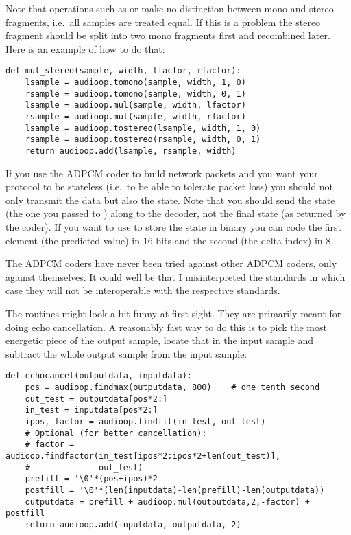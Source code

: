 Note that operations such as  or  make no
distinction between mono and stereo fragments, i.e.\ all samples are
treated equal.  If this is a problem the stereo fragment should be split
into two mono fragments first and recombined later.  Here is an example
of how to do that:
\bcode\begin{verbatim}
def mul_stereo(sample, width, lfactor, rfactor):
    lsample = audioop.tomono(sample, width, 1, 0)
    rsample = audioop.tomono(sample, width, 0, 1)
    lsample = audioop.mul(sample, width, lfactor)
    rsample = audioop.mul(sample, width, rfactor)
    lsample = audioop.tostereo(lsample, width, 1, 0)
    rsample = audioop.tostereo(rsample, width, 0, 1)
    return audioop.add(lsample, rsample, width)
\end{verbatim}\ecode

If you use the ADPCM coder to build network packets and you want your
protocol to be stateless (i.e.\ to be able to tolerate packet loss)
you should not only transmit the data but also the state. Note that
you should send the  state (the one you passed to
) along to the decoder, not the final state (as returned by
the coder). If you want to use  to store the state in
binary you can code the first element (the predicted value) in 16 bits
and the second (the delta index) in 8.

The ADPCM coders have never been tried against other ADPCM coders,
only against themselves. It could well be that I misinterpreted the
standards in which case they will not be interoperable with the
respective standards.

The  routines might look a bit funny at first sight.
They are primarily meant for doing echo cancellation. A reasonably
fast way to do this is to pick the most energetic piece of the output
sample, locate that in the input sample and subtract the whole output
sample from the input sample:
\bcode\begin{verbatim}
def echocancel(outputdata, inputdata):
    pos = audioop.findmax(outputdata, 800)    # one tenth second
    out_test = outputdata[pos*2:]
    in_test = inputdata[pos*2:]
    ipos, factor = audioop.findfit(in_test, out_test)
    # Optional (for better cancellation):
    # factor = audioop.findfactor(in_test[ipos*2:ipos*2+len(out_test)], 
    #              out_test)
    prefill = '\0'*(pos+ipos)*2
    postfill = '\0'*(len(inputdata)-len(prefill)-len(outputdata))
    outputdata = prefill + audioop.mul(outputdata,2,-factor) + postfill
    return audioop.add(inputdata, outputdata, 2)
\end{verbatim}\ecode
